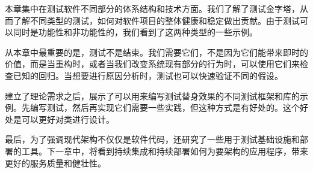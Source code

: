 本章集中在测试软件不同部分的体系结构和技术方面。我们了解了测试金字塔，从而了解不同类型的测试，如何对软件项目的整体健康和稳定做出贡献。由于测试可以同时是功能性和非功能性的，我们看到了这两种类型的一些示例。

从本章中最重要的是，测试不是结束。我们需要它们，不是因为它们能带来即时的价值，而是当重构时，或者当我们改变系统现有部分的行为时，可以使用它们来检查已知的回归。当想要进行原因分析时，测试也可以快速验证不同的假设。

建立了理论需求之后，展示了可以用来编写测试替身效果的不同测试框架和库的示例。先编写测试，然后再实现它们需要一些实践，但这种方式是有好处的。这个好处是可以更好对类进行设计。

最后，为了强调现代架构不仅仅是软件代码，还研究了一些用于测试基础设施和部署的工具。下一章中，将看到持续集成和持续部署如何为要架构的应用程序，带来更好的服务质量和健壮性。

